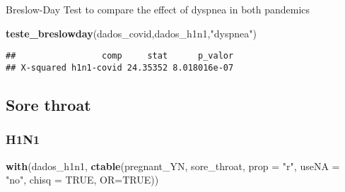 \documentclass[
]{article}
\newenvironment{Shaded}{\begin{snugshade}}{\end{snugshade}}
\newcommand{\DataTypeTok}[1]{\textcolor[rgb]{0.13,0.29,0.53}{#1}}
\newcommand{\DecValTok}[1]{\textcolor[rgb]{0.00,0.00,0.81}{#1}}
\newcommand{\KeywordTok}[1]{\textcolor[rgb]{0.13,0.29,0.53}{\textbf{#1}}}
\newcommand{\NormalTok}[1]{#1}
\newcommand{\OperatorTok}[1]{\textcolor[rgb]{0.81,0.36,0.00}{\textbf{#1}}}
\newcommand{\OtherTok}[1]{\textcolor[rgb]{0.56,0.35,0.01}{#1}}
\newcommand{\StringTok}[1]{\textcolor[rgb]{0.31,0.60,0.02}{#1}}
\begin{document}
Breslow-Day Test to compare the effect of dyspnea in both pandemics

\begin{Shaded}
\begin{Highlighting}[]
\KeywordTok{teste_breslowday}\NormalTok{(dados_covid,dados_h1n1,}\StringTok{"dyspnea"}\NormalTok{)}
\end{Highlighting}
\end{Shaded}

\begin{verbatim}
##                 comp     stat      p_valor
## X-squared h1n1-covid 24.35352 8.018016e-07
\end{verbatim}

\hypertarget{sore-throat}{%
\subsection{Sore throat}\label{sore-throat}}

\hypertarget{h1n1-14}{%
\subsubsection{H1N1}\label{h1n1-14}}

\begin{Shaded}
\end{Shaded}

\begin{Shaded}
\begin{Highlighting}[]
\KeywordTok{with}\NormalTok{(dados_h1n1, }\KeywordTok{ctable}\NormalTok{(pregnant_YN, sore_throat, }\DataTypeTok{prop =} \StringTok{"r"}\NormalTok{, }\DataTypeTok{useNA =} \StringTok{"no"}\NormalTok{, }\DataTypeTok{chisq =} \OtherTok{TRUE}\NormalTok{, }\DataTypeTok{OR=}\OtherTok{TRUE}\NormalTok{))}
\end{Highlighting}
\end{Shaded}
\end{document}
